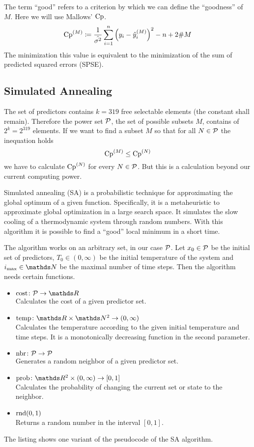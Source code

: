 		The term \enquote{good} refers to a criterion by which we can define the \enquote{goodness} of $M$.
		Here we will use Mallows' $\mathrm{Cp}$.
		\[
			\mathrm{Cp}^{(M)} \coloneqq \frac{1}{\hat{\sigma^2}}\sum_{i=1}^n\left( y_i-\hat{y}^{(M)}_i \right)^2 - n + 2\#M
		\]
		The minimization this value is equivalent to the minimization of the sum of predicted squared errors (SPSE).
	

	\subsection{Simulated Annealing}
	\label{ssec:simulated-annealing}
	
		The set of predictors contains $k=319$ free selectable elements (the constant shall remain).
		Therefore the power set $\mathcal{P}$, the set of possible subsets $M$, contains of $2^{k}=2^{319}$ elements.
		If we want to find a subset $M$ so that for all $N\in\mathcal{P}$ the inequation holds
		\[
			\mathrm{Cp}^{(M)} \leq \mathrm{Cp}^{(N)}
		\]
		we have to calculate $\mathrm{Cp}^{(N)}$ for every $N\in\mathcal{P}$.
		But this is a calculation beyond our current computing power.

		Simulated annealing (SA) is a probabilistic technique for approximating the global optimum of a given function.
		Specifically, it is a metaheuristic to approximate global optimization in a large search space.
		It simulates the slow cooling of a thermodynamic system through random numbers.
		With this algorithm it is possible to find a \enquote{good} local minimum in a short time.

		The algorithm works on an arbitrary set, in our case $\mathcal{P}$.
		Let $x_0\in\mathcal{P}$ be the initial set of predictors, $T_0\in(0,\infty)$ be the initial temperature of the system and $i_\m{max}\in\SN$ be the maximal number of time steps.
		Then the algorithm needs certain functions.
		\begin{itemize}
			\item $\func{\m{cost}}{\s{P}}{\SR}$ \\
				Calculates the cost of a given predictor set.
			\item $\func{\m{temp}}{\SR\times\SN^2}{(0,\infty)}$\\
				Calculates the temperature according to the given initial temperature and time steps.
				It is a monotonically decreasing function in the second parameter.
			\item $\mathrm{nbr}\colon\mathcal{P}\to\mathcal{P}$ \\
				Generates a random neighbor of a given predictor set.
			\item $\func{\m{prob}}{\SR^2\times(0,\infty)}{[0,1]}$ \\
				Calculates the probability of changing the current set or state to the neighbor.
			\item $\mathrm{rnd}(0,1)$ \\
				Returns a random number in the interval $[0,1]$.
		\end{itemize}
		The listing shows one variant of the pseudocode of the SA algorithm. 

